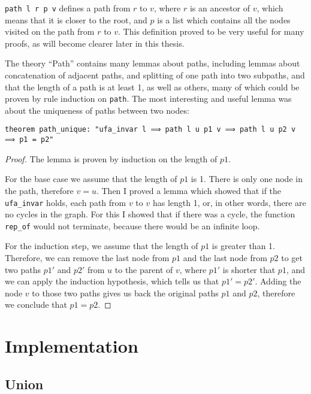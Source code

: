 \lstinline{path l r p v} defines a path from $r$ to $v$, where $r$ is an ancestor of $v$, which means that it is closer to the root, and $p$ is a list which contains all the nodes visited on the path from $r$ to $v$. This definition proved to be very useful for many proofs, as will become clearer later in this thesis.

The theory ``Path'' contains many lemmas about paths, including lemmas about concatenation of adjacent paths, and splitting of one path into two subpaths, and that the length of a path is at least 1, as well as others, many of which could be proven by rule induction on \lstinline{path}. The most interesting and useful lemma was about the uniqueness of paths between two nodes:

\begin{lstlisting}
theorem path_unique: "ufa_invar l ⟹ path l u p1 v ⟹ path l u p2 v ⟹ p1 = p2"
\end{lstlisting}

\begin{proof}
The lemma is proven by induction on the length of $p1$.

For the base case we assume that the length of $p1$ is 1. There is only one node in the path, therefore $v = u$. Then I proved a lemma which showed that if the \lstinline{ufa_invar} holds, each path from $v$ to $v$ has length 1, or, in other words, there are no cycles in the graph. For this I showed that if there was a cycle, the function \lstinline{rep_of} would not terminate, because there would be an infinite loop.

For the induction step, we assume that the length of $p1$ is greater than 1. Therefore, we can remove the last node from $p1$ and the last node from $p2$ to get two paths $p1'$ and $p2'$ from $u$ to the parent of $v$, where $p1'$ is shorter that $p1$, and we can apply the induction hypothesis, which tells us that $p1' = p2'$. Adding the node $v$ to those two paths gives us back the original paths $p1$ and $p2$, therefore we conclude that $p1 = p2$.
\end{proof}

\section{Implementation}

\subsection{Union}

